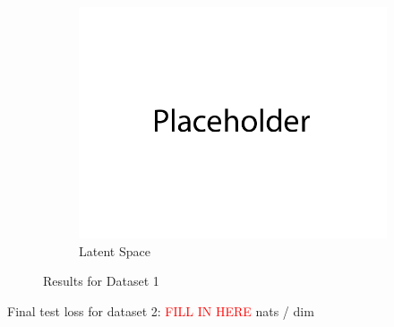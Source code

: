 \documentclass{article}
\begin{document}
\begin{figure}[H]
\begin{subfigure}{0.32\textwidth}
        \centering
        \includegraphics[width=\textwidth]{figures/q1_dset1_latents.png}
        \caption{Latent Space}
    \end{subfigure}
    \caption{Results for Dataset 1}
\end{figure}
Final test loss for dataset 2: \textcolor{red}{FILL IN HERE}  nats / dim
\end{document}
